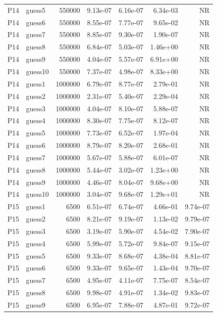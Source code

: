 {\begin{longtable}{llrrrrr}
P14 & guess5 & 550000 & 9.13e-07 & 6.16e-07 & 6.34e-03 & NR \\
P14 & guess6 & 550000 & 8.55e-07 & 7.77e-07 & 9.65e-02 & NR \\
P14 & guess7 & 550000 & 8.85e-07 & 9.30e-07 & 1.90e-07 & NR \\
P14 & guess8 & 550000 & 6.84e-07 & 5.03e-07 & 1.46e+00 & NR \\
P14 & guess9 & 550000 & 4.04e-07 & 5.57e-07 & 6.91e+00 & NR \\
P14 & guess10 & 550000 & 7.37e-07 & 4.98e-07 & 8.33e+00 & NR \\
P14 & guess1 & 1000000 & 6.79e-07 & 8.77e-07 & 2.79e-01 & NR \\
P14 & guess2 & 1000000 & 2.31e-07 & 5.40e-07 & 2.29e-04 & NR \\
P14 & guess3 & 1000000 & 4.04e-07 & 8.10e-07 & 5.88e-07 & NR \\
P14 & guess4 & 1000000 & 8.30e-07 & 7.75e-07 & 8.12e-07 & NR \\
P14 & guess5 & 1000000 & 7.73e-07 & 6.52e-07 & 1.97e-04 & NR \\
P14 & guess6 & 1000000 & 8.79e-07 & 8.20e-07 & 2.68e-01 & NR \\
P14 & guess7 & 1000000 & 5.67e-07 & 5.88e-07 & 6.01e-07 & NR \\
P14 & guess8 & 1000000 & 5.44e-07 & 3.02e-07 & 1.23e+00 & NR \\
P14 & guess9 & 1000000 & 4.46e-07 & 8.04e-07 & 9.68e+00 & NR \\
P14 & guess10 & 1000000 & 3.04e-07 & 9.68e-07 & 1.29e+01 & NR \\
P15 & guess1 & 6500 & 6.51e-07 & 6.74e-07 & 4.66e-01 & 9.74e-07 \\
P15 & guess2 & 6500 & 8.21e-07 & 9.19e-07 & 1.13e-02 & 9.79e-07 \\
P15 & guess3 & 6500 & 3.19e-07 & 5.90e-07 & 4.54e-02 & 7.90e-07 \\
P15 & guess4 & 6500 & 5.99e-07 & 5.72e-07 & 9.84e-07 & 9.15e-07 \\
P15 & guess5 & 6500 & 9.33e-07 & 8.68e-07 & 4.38e-04 & 8.81e-07 \\
P15 & guess6 & 6500 & 9.33e-07 & 9.65e-07 & 1.43e-04 & 9.70e-07 \\
P15 & guess7 & 6500 & 4.95e-07 & 4.11e-07 & 7.75e-07 & 8.54e-07 \\
P15 & guess8 & 6500 & 9.98e-07 & 4.91e-07 & 1.34e-02 & 9.83e-07 \\
P15 & guess9 & 6500 & 6.95e-07 & 7.88e-07 & 4.87e-01 & 9.72e-07 \\

\end{longtable}}
